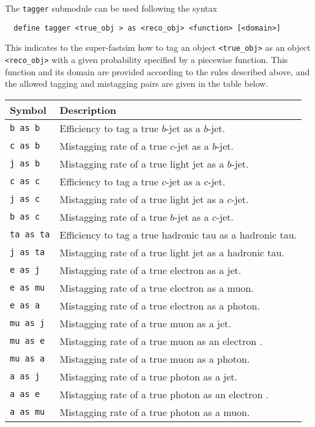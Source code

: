 \documentclass[a4paper]{article}
\begin{document}
\noindent The \verb+tagger+ submodule can be used following the syntax
{\color{ao} \begin{verbatim}
  define tagger <true_obj > as <reco_obj> <function> [<domain>]
\end{verbatim}}
\noindent This indicates to the super-fastsim how to tag an object
{\tt <true\_obj>} as an object {\tt <reco\_obj>} with a given probability
specified by a piecewise function. This function and its domain are provided
according to the rules described above, and the allowed tagging and mistagging
pairs are given in the table below.
\renewcommand{\arraystretch}{1.2}%
\begin{center}\begin{tabular}{l p{8.4cm}}
  \hline
  Symbol& Description\\
  \hline
  \color{ao} \verb?b as b? & Efficiency to tag a true $b$-jet as a $b$-jet.\\
  \color{ao} \verb?c as b? & Mistagging rate of a true $c$-jet as a $b$-jet.\\
  \color{ao} \verb?j as b? & Mistagging rate of a true light jet as a $b$-jet.\\
  \color{ao} \verb?c as c? & Efficiency to tag a true $c$-jet as a $c$-jet.\\
  \color{ao} \verb?j as c? & Mistagging rate of a true light jet as a $c$-jet.\\
  \color{ao} \verb?b as c? & Mistagging rate of a true $b$-jet as a $c$-jet.\\
  \color{ao} \verb?ta as ta? & Efficiency to tag a true hadronic tau as a
    hadronic tau.\\
  \color{ao} \verb?j as ta? & Mistagging rate of a true light jet as a hadronic
    tau.\\
  \color{ao} \verb?e as j?  & Mistagging rate of a true electron as a jet.\\
  \color{ao} \verb?e as mu? & Mistagging rate of a true electron as a muon.\\
  \color{ao} \verb?e as a?  & Mistagging rate of a true electron as a photon.\\
  \color{ao} \verb?mu as j? & Mistagging rate of a true muon as a jet.\\
  \color{ao} \verb?mu as e? & Mistagging rate of a true muon as an electron .\\
  \color{ao} \verb?mu as a? & Mistagging rate of a true muon as a photon.\\
  \color{ao} \verb?a as j?  & Mistagging rate of a true photon as a jet.\\
  \color{ao} \verb?a as e?  & Mistagging rate of a true photon as an electron .\\
  \color{ao} \verb?a as mu? & Mistagging rate of a true photon as a muon.\\
  \hline
 \end{tabular}
\end{center}
\end{document}
